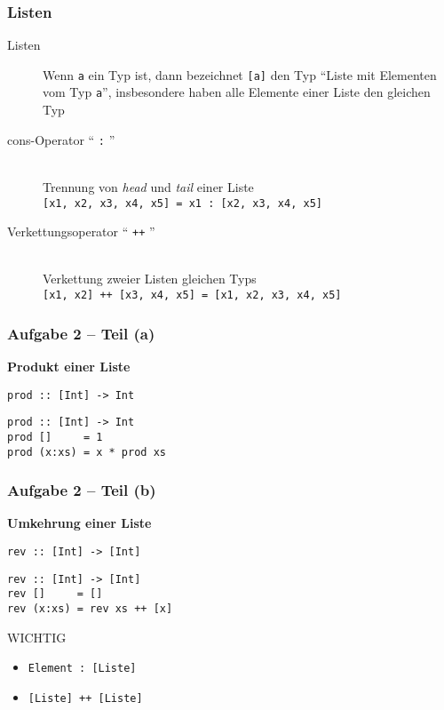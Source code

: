 \documentclass{beamer}
\begin{document}
	
	\begin{frame}[fragile] \frametitle{Listen}
		\begin{description}
			\item[Listen] Wenn \texttt{a} ein Typ ist, dann bezeichnet \texttt{[a]} den Typ ``Liste mit Elementen vom Typ \texttt{a}'', insbesondere haben alle Elemente einer Liste den gleichen Typ
			\bigskip \pause
			\item[cons-Operator `` \texttt{:} '']  ~\\ 
			Trennung von \textit{head} und \textit{tail} einer Liste \\
			\texttt{[x1, x2, x3, x4, x5] = x1 : [x2, x3, x4, x5]}
			\bigskip \pause
			\item[Verkettungsoperator `` \texttt{++} ''] ~\\ 
			Verkettung zweier Listen gleichen Typs \\
			\texttt{[x1, x2] ++ [x3, x4, x5] = [x1, x2, x3, x4, x5]}
		\end{description}
	\end{frame}


\begin{frame}[t, fragile] \frametitle{Aufgabe 2 -- Teil (a)}
	\textbf{Produkt einer Liste}
	
	\texttt{prod :: [Int] -> Int}
	
	\pause \bigskip
	
	\begin{lstlisting}[style=bg]
prod :: [Int] -> Int
prod []     = 1
prod (x:xs) = x * prod xs
	\end{lstlisting}
\end{frame}

\begin{frame}[t, fragile] \frametitle{Aufgabe 2 -- Teil (b)}
	\textbf{Umkehrung einer Liste}
	
	\texttt{rev :: [Int] -> [Int]}
	
	\pause \bigskip
	
	\begin{lstlisting}[style=bg]
rev :: [Int] -> [Int]
rev []     = []
rev (x:xs) = rev xs ++ [x]
	\end{lstlisting}

	\begin{alertblock}{WICHTIG}
		\begin{itemize}
			\item \texttt{Element : [Liste]}
			\item \texttt{[Liste] ++ [Liste]}
		\end{itemize}
	\end{alertblock}
\end{frame}
\end{document}
